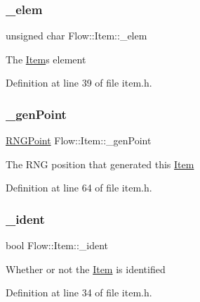 \hypertarget{class_flow_1_1_item_a977a018070e3ce6992d652b0cf178cb3}{}\label{class_flow_1_1_item_a977a018070e3ce6992d652b0cf178cb3} 
\subsubsection{\texorpdfstring{\+\_\+elem}{\_elem}}
{\footnotesize\ttfamily unsigned char Flow\+::\+Item\+::\+\_\+elem\hspace{0.3cm}{\ttfamily [protected]}}

The \hyperlink{class_flow_1_1_item}{Item}\textquotesingle{}s element 

Definition at line 39 of file item.\+h.

\hypertarget{class_flow_1_1_item_a87ac75440226f3f7e14211b5eae81618}{}\label{class_flow_1_1_item_a87ac75440226f3f7e14211b5eae81618} 
\subsubsection{\texorpdfstring{\+\_\+gen\+Point}{\_genPoint}}
{\footnotesize\ttfamily \hyperlink{struct_flow_1_1_r_n_g_point}{R\+N\+G\+Point} Flow\+::\+Item\+::\+\_\+gen\+Point\hspace{0.3cm}{\ttfamily [protected]}}

The R\+NG position that generated this \hyperlink{class_flow_1_1_item}{Item} 

Definition at line 64 of file item.\+h.

\hypertarget{class_flow_1_1_item_abefb3d3a64bfc77c93f0ca9b325c966e}{}\label{class_flow_1_1_item_abefb3d3a64bfc77c93f0ca9b325c966e} 
\subsubsection{\texorpdfstring{\+\_\+ident}{\_ident}}
{\footnotesize\ttfamily bool Flow\+::\+Item\+::\+\_\+ident\hspace{0.3cm}{\ttfamily [protected]}}

Whether or not the \hyperlink{class_flow_1_1_item}{Item} is identified 

Definition at line 34 of file item.\+h.

